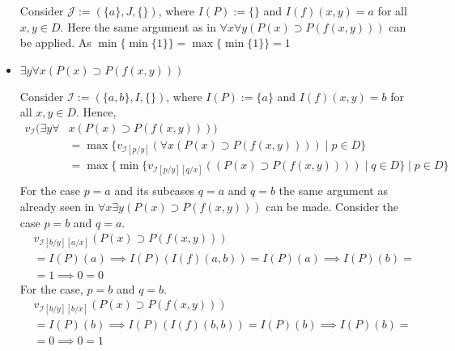 \documentclass[11pt,a4paper]{article}
\begin{document}
\begin{itemize}

Consider $\mathcal{J}:=(\{a\}, J, \{\})$, where $I(P):=\{\}$ and $I(f)(x,y)=a$ for all $x,y \in D$.
Here the same argument as in  $\forall x \forall  y (P(x) \supset P(f(x,y)))$ can be applied. As $\min \{\min \{ 1 \} \} = \max \{\min \{ 1 \} \} = 1 $


\item  $\exists y \forall  x (P(x) \supset P(f(x,y)))$

Consider $\mathcal{I}:=(\{a,b\}, I, \{\})$, where $I(P):=\{a\}$ and $I(f)(x,y)=b$ for all $x,y \in D$.
Hence,
\begin{equation*}
\begin{split}
v_{\mathcal{I}}(\exists y \forall  &x (P(x) \supset P(f(x,y)))) \\
&=\max \{v_{\mathcal{I}[p/y]}( \forall  x (P(x) \supset P(f(x,y))))  \mid  p \in D\}\\
&=\max \{\min \{v_{\mathcal{I}[p/y][q/x]}((P(x) \supset P(f(x,y))))  \mid  q \in D\} \mid  p \in D\} \\
\end{split}
\end{equation*}
For the case $p=a$ and its subcases $q=a$ and $q=b$ the same argument as  already seen in $\forall x \exists  y (P(x) \supset P(f(x,y)))$ can be made.
Consider the case $p=b$ and $q=a$.
\begin{equation*}
\begin{split}
&v_{\mathcal{I}[b/y][a/x]}(P(x) \supset P(f(x,y)))\\ 
&=I(P)(a) \implies I(P)(I(f)(a,b)) = I(P)(a) \implies I(P)(b) = \\
&= 1 \implies 0 = 0
\end{split}
\end{equation*}
For the case, $p=b$ and $q=b$.
\begin{equation*}
\begin{split}
&v_{\mathcal{I}[b/y][b/x]}(P(x) \supset P(f(x,y)))\\ 
&=I(P)(b) \implies I(P)(I(f)(b,b)) = I(P)(b) \implies I(P)(b) = \\
&= 0 \implies 0 = 1
\end{split}
\end{equation*}


\end{itemize}
\end{document}
